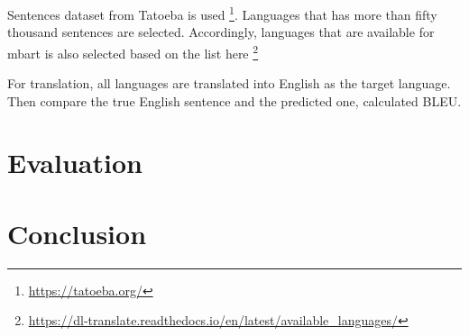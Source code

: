 \documentclass[a4paper]{article}
\begin{document}
Sentences dataset from Tatoeba is used \footnote{\url{https://tatoeba.org/}}. Languages that has more than fifty thousand sentences are selected. Accordingly, languages that are available for mbart is also selected based on the list here \footnote{\url{https://dl-translate.readthedocs.io/en/latest/available_languages/}}

For translation, all languages are translated into English as the target language. Then compare the true English sentence and the predicted one, calculated BLEU.

\section{Evaluation}

\section{Conclusion}

\printbibliography
\end{document}
